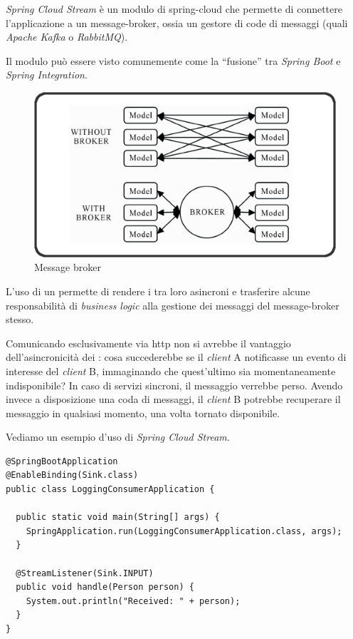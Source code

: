 \textit{Spring Cloud Stream} è un modulo di \gls{spring-cloud} che permette di connettere l'applicazione a un \gls{message-broker}\gloss,
ossia un gestore di code di messaggi (quali \textit{Apache Kafka} o \textit{RabbitMQ}).

Il modulo può essere visto comunemente come la ``fusione'' tra \textit{Spring Boot} e \textit{Spring Integration}.

\begin{figure}[H]
	\centering
	\includegraphics[width=\textwidth]{immagini/message-broker.png}
	\caption[Message broker]{Message broker\footnotemark}
	\label{fig:message-broker}
\end{figure}

L'uso di un  permette di rendere i  tra loro asincroni e trasferire alcune responsabilità di \textit{business logic} alla gestione dei messaggi del \gls{message-broker} stesso.

Comunicando esclusivamente via \acrshort{http} non si avrebbe il vantaggio dell'asincronicità dei : cosa succederebbe se il \textit{client} A notificasse un evento di interesse del \textit{client} B, immaginando che quest'ultimo sia momentaneamente indisponibile?
In caso di servizi sincroni, il messaggio verrebbe perso. Avendo invece a disposizione una coda di messaggi, il \textit{client} B potrebbe recuperare il messaggio in qualsiasi momento, una volta tornato disponibile.

Vediamo un esempio d'uso di \textit{Spring Cloud Stream}.
\begin{tcolorbox}
	\begin{lstlisting}
@SpringBootApplication
@EnableBinding(Sink.class)
public class LoggingConsumerApplication {

  public static void main(String[] args) {
    SpringApplication.run(LoggingConsumerApplication.class, args);
  }

  @StreamListener(Sink.INPUT)
  public void handle(Person person) {
    System.out.println("Received: " + person);
  }
}
	\end{lstlisting}
\end{tcolorbox}

